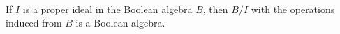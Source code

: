 If $I$ is a proper ideal in the Boolean algebra $B$, then $B/I$ with the operations induced from $B$ is a Boolean algebra.
